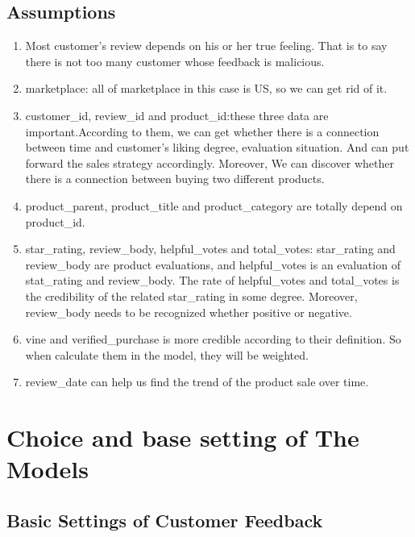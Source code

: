 \documentclass{mcmthesis}
\begin{document}
\subsection{Assumptions}
\begin{enumerate}
\item Most customer's review depends on his or her true feeling. That is to say there is not too many customer whose feedback is malicious.

\item marketplace: all of marketplace in this case is US, so we can get rid of it.

\item customer\_id, review\_id and product\_id:these three data are important.According to them, we can get whether there is a connection between time and customer's liking degree, evaluation situation. And can put forward the sales strategy accordingly. Moreover, We can discover whether there is a connection between buying two different products.
    
\item product\_parent, product\_title and product\_category are totally depend on product\_id.

\item star\_rating, review\_body, helpful\_votes and total\_votes: star\_rating and review\_body are product evaluations, and helpful\_votes is an evaluation of stat\_rating and review\_body. The rate of helpful\_votes and total\_votes is the credibility of the related star\_rating in some degree. Moreover, review\_body needs to be recognized whether positive or negative. 

\item vine and verified\_purchase is more credible according to their definition. So when calculate them in the model, they will be weighted.

\item review\_date can help us find the trend of the product sale over time.
\end{enumerate}

\section{Choice and base setting of The Models}

\subsection{Basic Settings of Customer Feedback}
\end{document}
